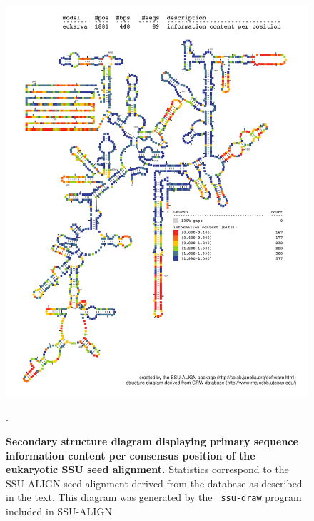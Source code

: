 \begin{figure}
\begin{center}
\includegraphics[width=5.64in]{Figures/eukarya-0p1-info}
\end{center}
\caption[Secondary structure diagram displaying primary sequence
  information content per consensus position of the eukaryotic SSU seed
  alignment]{\textbf{Secondary structure diagram displaying primary
  sequence information content per consensus position of the eukaryotic SSU seed
  alignment.} Statistics correspond to the SSU-ALIGN seed
  alignment derived from the  database \cite{CannoneGutell02}
  as described in the text. This diagram was generated by the {\tt
  ssu-draw} program included in SSU-ALIGN}.
\label{fig:eukinfo}
\end{figure}

\newpage 

